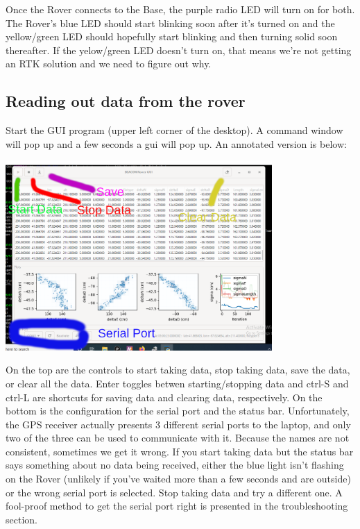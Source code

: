 \documentclass[usletter]{article}
\begin{document}
Once the Rover connects to the Base, the purple radio LED will turn on for
both. The Rover's blue LED should start blinking soon after it's turned on and
the yellow/green LED should hopefully start blinking and then turning solid
soon thereafter. If the yelow/green LED doesn't turn on, that means we're not
getting an RTK solution and we need to figure out why. 

\subsection{Reading out data from the rover} 

Start the GUI program (upper left corner of the desktop). A command window will pop up and a few seconds a gui will pop up. An annotated version is below:

\begin{center} 
\includegraphics[width=4in]{gui} 
\end{center} 

On the top are the controls to start taking data, stop taking data, save the data, or clear all the data. Enter toggles betwen starting/stopping data and ctrl-S and ctrl-L are shortcuts for saving data and clearing data, respectively. 
On the bottom is  the configuration for the serial port and the status bar. Unfortunately, the GPS receiver actually presents 3 different serial ports to the laptop, and only two of the three can be used to communicate with it. Because the names are not consistent, sometimes we get it wrong. If you start taking data but the status bar says something about no data being received, either the blue light isn't flashing on the Rover (unlikely if you've waited more than a few seconds and are outside) or the wrong serial port is selected. Stop taking data and try a different one. 
A fool-proof method to get the serial port right is presented in the troubleshooting section.
\end{document}
